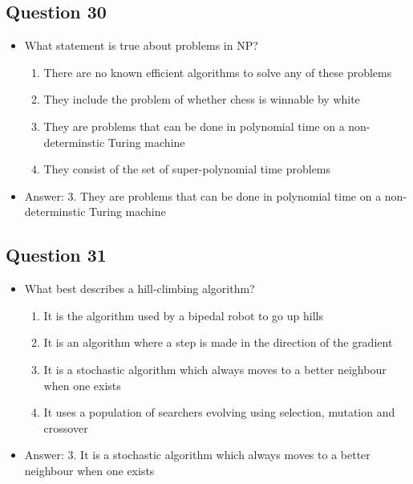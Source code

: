 \begin{slide}
\section[-1]{Question 30}

\begin{PauseHighLight}
  \begin{itemize}
  \item What statement is true about problems in NP?
    \begin{enumerate}
    \item There are no known efficient algorithms to solve any of these problems
    \item They include the problem of whether chess is winnable by white
    \item They are problems that can be done in polynomial time on a non-determinstic Turing machine
    \item They consist of the set of super-polynomial time problems\pause
    \end{enumerate}
  \item Answer: 3. They are problems that can be done in polynomial time on a non-determinstic Turing machine\pauseb
  \end{itemize}
\end{PauseHighLight}
\end{slide}

\begin{slide}
\section[-1]{Question 31}

\begin{PauseHighLight}
  \begin{itemize}
  \item What best describes a hill-climbing algorithm?
    \begin{enumerate}
    \item It is the algorithm used by a bipedal robot to go up hills
    \item It is an algorithm where a step is made in the direction of the gradient
    \item It is a stochastic algorithm which always moves to a better neighbour when one exists
    \item It uses a population of searchers evolving using selection, mutation and crossover\pause
    \end{enumerate}
  \item Answer: 3. It is a stochastic algorithm which always moves to a better neighbour when one exists\pauseb
  \end{itemize}
\end{PauseHighLight}
\end{slide}

